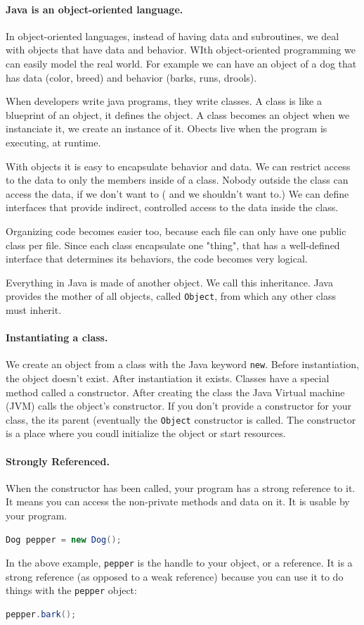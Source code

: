 \documentclass[fleqn,10pt]{SelfArx} %
\begin{document}
\paragraph{Java is an object-oriented language.} In object-oriented languages, instead of having data and subroutines, we deal with objects that have data and behavior. WIth object-oriented programming we can easily model the real world. For example we can have an object of a dog that has data (color, breed) and behavior (barks, runs, drools). 

When developers write java programs, they write classes. A class is like a blueprint of an object, it defines the object. A class becomes an object when we instanciate it, we create an instance of it. Obects live when the program is executing, at runtime.

With objects it is easy to encapsulate behavior and data. We can restrict access to the data to only the members inside of a class. Nobody outside the class can access the data, if we don't want to ( and we shouldn't want to.) We can define interfaces that provide indirect, controlled access to the data inside the class.

Organizing code becomes easier too, because each file can only have one  public class per file. Since each class encapsulate one "thing", that has a well-defined interface that determines its behaviors, the code becomes very logical.

Everything in Java is made of another object. We call this inheritance. Java provides the mother of all objects, called \texttt{Object}, from which any other class must inherit.

\paragraph{Instantiating a class.} We create an object from a class with the Java keyword \texttt{new}. Before instantiation, the object doesn't exist. After instantiation it exists. Classes have a special method called a constructor. After creating the class the Java Virtual machine (JVM) calls the object's constructor. If you don't provide a constructor for your class, the its parent (eventually the \texttt{Object} constructor is called. The constructor is a place where you coudl initialize the object or start resources.\cite{nicholas}

\paragraph{Strongly Referenced.} When the constructor has been called, your program has a strong reference to it.\cite{reference} It means you can access the non-private methods and data on it. It is usable by your program.
\begin{lstlisting}[language=Java]
Dog pepper = new Dog();
\end{lstlisting}
In the above example, \texttt{pepper} is the handle to your object, or a reference. It is a strong reference (as opposed to a weak reference) because you can use it to do things with the \texttt{pepper} object:
\begin{lstlisting}[language=Java]
pepper.bark();
\end{lstlisting}
\end{document}
